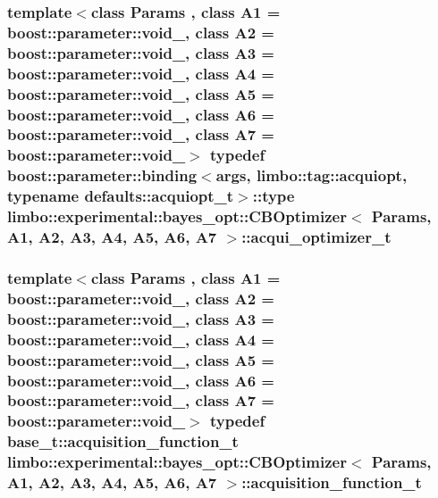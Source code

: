 \subsubsection[{acqui\+\_\+optimizer\+\_\+t}]{\setlength{\rightskip}{0pt plus 5cm}template$<$class Params , class A1  = boost\+::parameter\+::void\+\_\+, class A2  = boost\+::parameter\+::void\+\_\+, class A3  = boost\+::parameter\+::void\+\_\+, class A4  = boost\+::parameter\+::void\+\_\+, class A5  = boost\+::parameter\+::void\+\_\+, class A6  = boost\+::parameter\+::void\+\_\+, class A7  = boost\+::parameter\+::void\+\_\+$>$ typedef boost\+::parameter\+::binding$<${\bf args}, limbo\+::tag\+::acquiopt, typename {\bf defaults\+::acquiopt\+\_\+t}$>$\+::type {\bf limbo\+::experimental\+::bayes\+\_\+opt\+::\+C\+B\+Optimizer}$<$ Params, A1, A2, A3, A4, A5, A6, A7 $>$\+::{\bf acqui\+\_\+optimizer\+\_\+t}}\label{classlimbo_1_1experimental_1_1bayes__opt_1_1_c_b_optimizer_afc949eca6b8ea7a84b5e0b38e8c17a4d}
\hypertarget{classlimbo_1_1experimental_1_1bayes__opt_1_1_c_b_optimizer_aa8977e9e98215bb5e727ce2e182099dd}{}
\subsubsection[{acquisition\+\_\+function\+\_\+t}]{\setlength{\rightskip}{0pt plus 5cm}template$<$class Params , class A1  = boost\+::parameter\+::void\+\_\+, class A2  = boost\+::parameter\+::void\+\_\+, class A3  = boost\+::parameter\+::void\+\_\+, class A4  = boost\+::parameter\+::void\+\_\+, class A5  = boost\+::parameter\+::void\+\_\+, class A6  = boost\+::parameter\+::void\+\_\+, class A7  = boost\+::parameter\+::void\+\_\+$>$ typedef {\bf base\+\_\+t\+::acquisition\+\_\+function\+\_\+t} {\bf limbo\+::experimental\+::bayes\+\_\+opt\+::\+C\+B\+Optimizer}$<$ Params, A1, A2, A3, A4, A5, A6, A7 $>$\+::{\bf acquisition\+\_\+function\+\_\+t}}\label{classlimbo_1_1experimental_1_1bayes__opt_1_1_c_b_optimizer_aa8977e9e98215bb5e727ce2e182099dd}
\hypertarget{classlimbo_1_1experimental_1_1bayes__opt_1_1_c_b_optimizer_a63a9a28cc266539b492774e381d06d6f}{}
